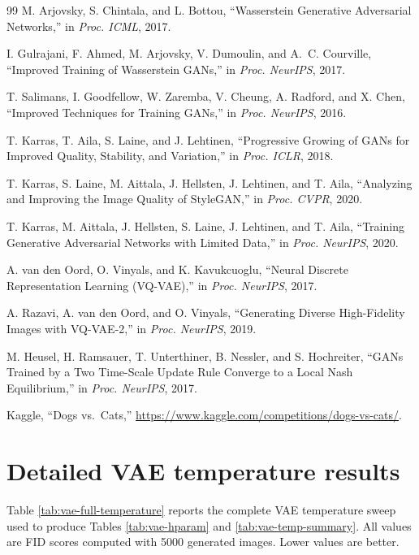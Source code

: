 \documentclass[11pt,a4paper]{article}
\begin{document}
\begin{thebibliography}{99}
M. Arjovsky, S. Chintala, and L. Bottou, ``Wasserstein Generative Adversarial Networks,'' in \textit{Proc. ICML}, 2017.

I. Gulrajani, F. Ahmed, M. Arjovsky, V. Dumoulin, and A.~C. Courville, ``Improved Training of Wasserstein GANs,'' in \textit{Proc. NeurIPS}, 2017.

T. Salimans, I. Goodfellow, W. Zaremba, V. Cheung, A. Radford, and X. Chen, ``Improved Techniques for Training GANs,'' in \textit{Proc. NeurIPS}, 2016.

T. Karras, T. Aila, S. Laine, and J. Lehtinen, ``Progressive Growing of GANs for Improved Quality, Stability, and Variation,'' in \textit{Proc. ICLR}, 2018.

T. Karras, S. Laine, M. Aittala, J. Hellsten, J. Lehtinen, and T. Aila, ``Analyzing and Improving the Image Quality of StyleGAN,'' in \textit{Proc. CVPR}, 2020.

T. Karras, M. Aittala, J. Hellsten, S. Laine, J. Lehtinen, and T. Aila, ``Training Generative Adversarial Networks with Limited Data,'' in \textit{Proc. NeurIPS}, 2020.

A. van den Oord, O. Vinyals, and K. Kavukcuoglu, ``Neural Discrete Representation Learning (VQ-VAE),'' in \textit{Proc. NeurIPS}, 2017.

A. Razavi, A. van den Oord, and O. Vinyals, ``Generating Diverse High-Fidelity Images with VQ-VAE-2,'' in \textit{Proc. NeurIPS}, 2019.

M. Heusel, H. Ramsauer, T. Unterthiner, B. Nessler, and S. Hochreiter, ``GANs Trained by a Two Time-Scale Update Rule Converge to a Local Nash Equilibrium,'' in \textit{Proc. NeurIPS}, 2017.

Kaggle, ``Dogs vs.\ Cats,'' \url{https://www.kaggle.com/competitions/dogs-vs-cats/}.

\end{thebibliography}

\clearpage
\appendix
\section{Detailed VAE temperature results}
\label{app:vae-full-results}

Table \ref{tab:vae-full-temperature} reports the complete VAE temperature sweep used to produce Tables \ref{tab:vae-hparam} and \ref{tab:vae-temp-summary}.
All values are FID scores computed with 5000 generated images. Lower values are better.
\end{document}
